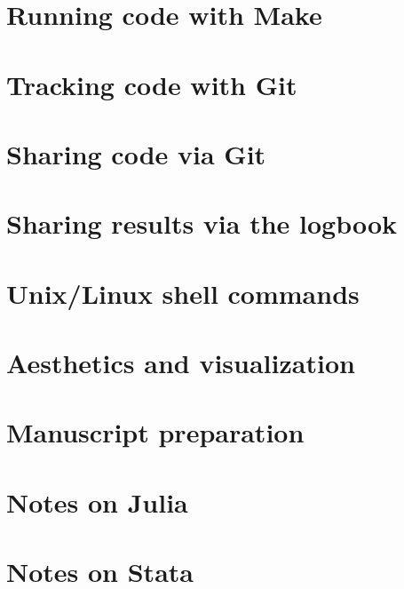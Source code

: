 \documentclass{report}
\numberwithin{equation}{section}
\numberwithin{figure}{section}
\numberwithin{table}{section}
\begin{document}
\section{Running code with Make} 
\section{Tracking code with Git} 

\section{Sharing code via Git} 
\section{Sharing results via the logbook} 

\section{Unix/Linux shell commands} 
\section{Aesthetics and visualization} 
\section{Manuscript preparation} 
\section{Notes on Julia} 

\section{Notes on Stata} 
\end{document}
